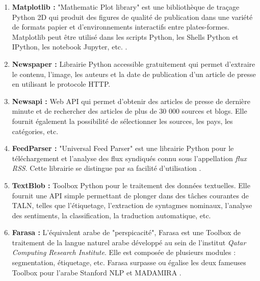 \begin{enumerate}[leftmargin=*]
                \item{\textbf{Matplotlib : }}
                "Mathematic Plot library" est une bibliothèque de traçage Python 2D qui produit des figures de qualité de publication dans une variété de formats papier et d'environnements interactifs entre plates-formes. Matplotlib peut être utilisé dans les scripts Python, les Shells Python et IPython, les notebook Jupyter, etc. \cite{matplotlib}.\\

                \item{\textbf{Newspaper : }}
                Librairie Python accessible gratuitement qui permet d'extraire le contenu, l'image, les auteurs et la date de publication d'un article de presse en utilisant le protocole HTTP.\\

                \item{\textbf{Newsapi : }}
                Web API qui permet d'obtenir des articles de presse de dernière minute et de rechercher des articles de plus de 30 000 sources et blogs. Elle fournit également la possibilité de sélectionner les sources, les pays, les catégories, etc.\\

                \item{\textbf{FeedParser : }}
                "Universal Feed Parser" est une librairie Python pour le téléchargement et l'analyse des flux syndiqués connu sous l'appellation \emph{flux RSS}. Cette librairie se distingue par sa facilité d'utilisation \cite{feedparser}.\\

                \item{\textbf{TextBlob : }}
                Toolbox Python pour le traitement des données textuelles. Elle fournit une API simple permettant de plonger dans des tâches courantes de TALN, telles que l'étiquetage, l'extraction de syntagmes nominaux, l'analyse des sentiments, la classification, la traduction automatique, etc. \cite{textblob}\\

                \item{\textbf{Farasa : }}
                L'équivalent arabe de "perspicacité", Farasa est une Toolbox de traitement de la langue naturel arabe développé au sein de l'institut \emph{Qatar Computing Research Institute}. Elle est composée de plusieurs modules : segmentation, étiquetage, etc. Farasa surpasse ou égalise les deux fameuses Toolbox pour l'arabe Stanford NLP et MADAMIRA \cite{farasa}.\\


\end{enumerate}
